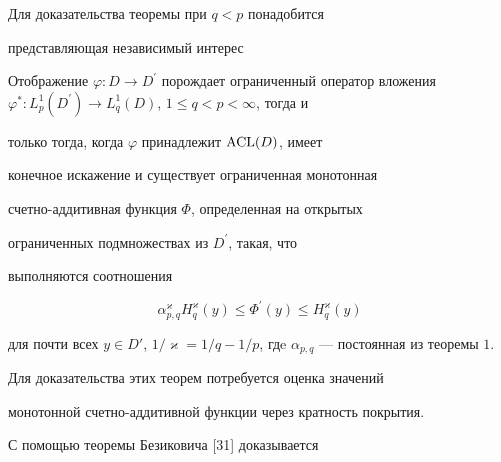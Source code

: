 Для доказательства теоремы при $q<p$ понадобится


представляющая независимый интерес





\begin{thm}


Отображение $\varphi : D\to


D^{\prime}$ порождает ограниченный оператор вложения $\varphi^{\ast} :


L^1_p(D^{\prime})\to L^1_q(D)$, $1\leq q< p<\infty$, тогда и


только тогда, когда $\varphi$ принадлежит $\operatorname{ACL}(D)$, имеет


конечное искажение и существует ограниченная монотонная


счетно-аддитивная функция $\Phi$, определенная на открытых


ограниченных подмножествах из $D^{\prime}$, такая, что


выполняются соотношения


$$


\alpha^{\varkappa}_{p,q}H^{\varkappa}_q(y)\leq\Phi^{\prime}(y)\leq


H^{\varkappa}_q(y)


$$


для почти всех $y\in D'$, $1/\varkappa = 1/q -


1/p$, гдe $\alpha_{p,q}$ --- постоянная из теоремы $1$.


\end{thm}





Для доказательства этих теорем потребуется оценка значений


монотонной счетно-аддитивной функции через кратность покрытия.





С помощью теоремы Безиковича [31] доказывается





